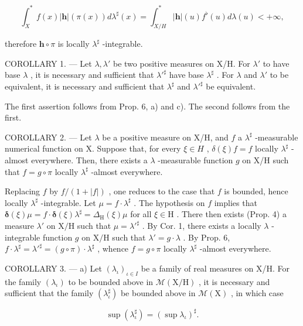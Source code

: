 \[
\int_ {X} ^ {*} f (x) | \mathbf {h} | (\pi (x)) d \lambda^ {\sharp} (x) = \int_ {X / H} ^ {*} | \mathbf {h} | (u) f ^ {\flat} (u) d \lambda (u) <   + \infty ,
\]

therefore \(\mathbf{h} \circ \pi\) is locally \(\lambda^{\sharp}\) -integrable.

COROLLARY 1. --- Let \(\lambda, \lambda'\) be two positive measures on X/H. For \(\lambda'\) to have base \(\lambda\) , it is necessary and sufficient that \(\lambda'^{\sharp}\) have base \(\lambda^{\sharp}\) . For \(\lambda\) and \(\lambda'\) to be equivalent, it is necessary and sufficient that \(\lambda^{\sharp}\) and \(\lambda'^{\sharp}\) be equivalent.

The first assertion follows from Prop. 6, a) and c). The second follows from the first.

COROLLARY 2. --- Let \(\lambda\) be a positive measure on X/H, and \(f\) a \(\lambda^{\sharp}\) -measurable numerical function on X. Suppose that, for every \(\xi \in H\) , \(\delta(\xi)f = f\) locally \(\lambda^{\sharp}\) -almost everywhere. Then, there exists a \(\lambda\) -measurable function \(g\) on X/H such that \(f = g \circ \pi\) locally \(\lambda^{\sharp}\) -almost everywhere.

Replacing \(f\) by \(f / (1 + |f|)\) , one reduces to the case that \(f\) is bounded, hence locally \(\lambda^{\sharp}\) -integrable. Let \(\mu = f \cdot \lambda^{\sharp}\) . The hypothesis on \(f\) implies that \(\pmb{\delta}(\xi) \mu = f \cdot \pmb{\delta}(\xi) \lambda^{\sharp} = \Delta_{\mathrm{H}}(\xi) \mu\) for all \(\xi \in \mathrm{H}\) . There then exists (Prop. 4) a measure \(\lambda'\) on \(\mathrm{X} / \mathrm{H}\) such that \(\mu = \lambda'^{\sharp}\) . By Cor. 1, there exists a locally \(\lambda\) -integrable function \(g\) on \(\mathrm{X} / \mathrm{H}\) such that \(\lambda' = g \cdot \lambda\) . By Prop. 6, \(f \cdot \lambda^{\sharp} = \lambda'^{\sharp} = (g \circ \pi) \cdot \lambda^{\sharp}\) , whence \(f = g \circ \pi\) locally \(\lambda^{\sharp}\) -almost everywhere.

COROLLARY 3. --- a) Let \((\lambda_{\iota})_{\iota \in I}\) be a family of real measures on X/H. For the family \((\lambda_{\iota})\) to be bounded above in \(\mathcal{M}(\mathrm{X / H})\) , it is necessary and sufficient that the family \((\lambda_{\iota}^{\sharp})\) be bounded above in \(\mathcal{M}(\mathrm{X})\) , in which case

\[
\sup (\lambda_ {\iota} ^ {\sharp}) = (\sup \lambda_ {\iota}) ^ {\sharp}.
\]

